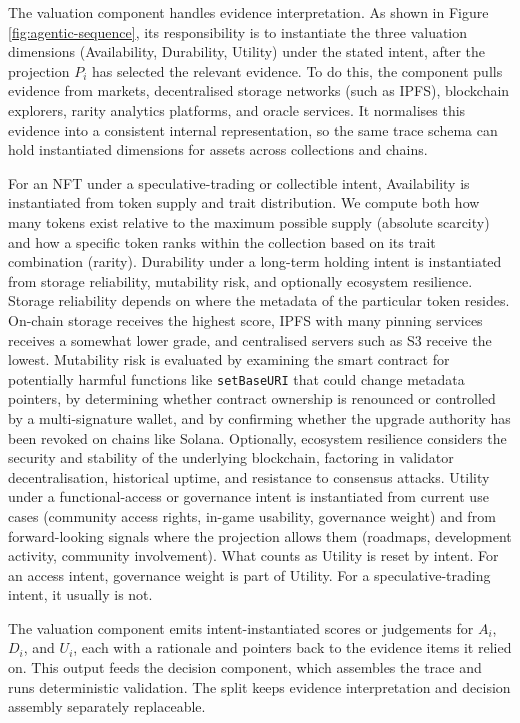 The valuation component handles evidence interpretation. As shown in Figure \ref{fig:agentic-sequence}, its responsibility is to instantiate the three valuation dimensions (Availability, Durability, Utility) under the stated intent, after the projection $P_i$ has selected the relevant evidence. To do this, the component pulls evidence from markets, decentralised storage networks (such as IPFS), blockchain explorers, rarity analytics platforms, and oracle services. It normalises this evidence into a consistent internal representation, so the same trace schema can hold instantiated dimensions for assets across collections and chains.

For an NFT under a speculative-trading or collectible intent, Availability is instantiated from token supply and trait distribution.
We compute both how many tokens exist relative to the maximum possible supply (absolute scarcity) and how a specific token ranks within the collection based on its trait combination (rarity).
Durability under a long-term holding intent is instantiated from storage reliability, mutability risk, and optionally ecosystem resilience. Storage reliability depends on where the metadata of the particular token resides. On-chain storage receives the highest score, IPFS with many pinning services receives a somewhat lower grade, and centralised servers such as S3 receive the lowest. Mutability risk is evaluated by examining the smart contract for potentially harmful functions like \texttt{setBaseURI} that could change metadata pointers, by determining whether contract ownership is renounced or controlled by a multi-signature wallet, and by confirming whether the upgrade authority has been revoked on chains like Solana. Optionally, ecosystem resilience considers the security and stability of the underlying blockchain, factoring in validator decentralisation, historical uptime, and resistance to consensus attacks.
Utility under a functional-access or governance intent is instantiated from current use cases (community access rights, in-game usability, governance weight) and from forward-looking signals where the projection allows them (roadmaps, development activity, community involvement). What counts as Utility is reset by intent. For an access intent, governance weight is part of Utility. For a speculative-trading intent, it usually is not.

The valuation component emits intent-instantiated scores or judgements for $A_i$, $D_i$, and $U_i$, each with a rationale and pointers back to the evidence items it relied on. This output feeds the decision component, which assembles the trace and runs deterministic validation. The split keeps evidence interpretation and decision assembly separately replaceable.

